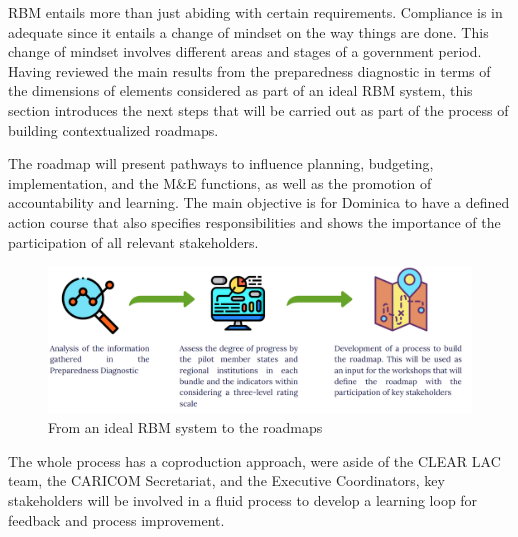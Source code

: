 \documentclass[
  10pt,
]{book}
\begin{document}
RBM entails more than just abiding with certain requirements. Compliance is in adequate since it entails a change of mindset on the way things are done. This change of mindset involves different areas and stages of a government period. Having reviewed the main results from the preparedness diagnostic in terms of the dimensions of elements considered as part of an ideal RBM system, this section introduces the next steps that will be carried out as part of the process of building contextualized roadmaps.

The roadmap will present pathways to influence planning, budgeting, implementation, and the M\&E functions, as well as the promotion of accountability and learning. The main objective is for Dominica to have a defined action course that also specifies responsibilities and shows the importance of the participation of all relevant stakeholders.

\begin{figure}
\includegraphics[width=1\linewidth]{./images/figure_6} \caption{From an ideal RBM system to the roadmaps}\label{fig:figure6}
\end{figure}

The whole process has a coproduction approach, were aside of the CLEAR LAC team, the CARICOM Secretariat, and the Executive Coordinators, key stakeholders will be involved in a fluid process to develop a learning loop for feedback and process improvement.
\end{document}
